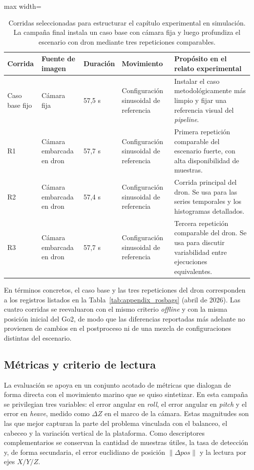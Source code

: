 \documentclass[12pt,a4paper]{report}
\begin{document}
\begin{table}[H]
\centering
\caption{Corridas seleccionadas para estructurar el capítulo experimental en
simulación. La campaña final instala un caso base con cámara fija y luego
profundiza el escenario con dron mediante tres repeticiones comparables.}
\label{tab:sim_selected_runs}
\begin{adjustbox}{max width=\textwidth}
\begin{tabular}{p{}>{\raggedright\arraybackslash}p{}p{}p{}p{}}
\toprule
Corrida & Fuente de imagen & Duración & Movimiento & Propósito en el relato experimental \\
\midrule
Caso base fijo & Cámara fija & 57,5 s & Configuración sinusoidal de referencia & Instalar el caso metodológicamente más limpio y fijar una referencia visual del \textit{pipeline}. \\
R1 & Cámara embarcada en dron & 57,7 s & Configuración sinusoidal de referencia & Primera repetición comparable del escenario fuerte, con alta disponibilidad de muestras. \\
R2 & Cámara embarcada en dron & 57,4 s & Configuración sinusoidal de referencia & Corrida principal del dron. Se usa para las series temporales y los histogramas detallados. \\
R3 & Cámara embarcada en dron & 57,7 s & Configuración sinusoidal de referencia & Tercera repetición comparable del dron. Se usa para discutir variabilidad entre ejecuciones equivalentes. \\
\bottomrule
\end{tabular}
\end{adjustbox}
\end{table}

En términos concretos, el caso base y las tres repeticiones del dron corresponden
a los registros listados en la Tabla~\ref{tab:appendix_rosbags} (abril de
2026). Las cuatro corridas se reevaluaron con el mismo criterio
\textit{offline} y con la misma posición inicial del Go2, de modo que las
diferencias reportadas más adelante no provienen de cambios en el postproceso ni
de una mezcla de configuraciones distintas del escenario.

\subsection{Métricas y criterio de lectura}

La evaluación se apoya en un conjunto acotado de métricas que dialogan de forma
directa con el movimiento marino que se quiso sintetizar. En esta campaña se
privilegian tres variables: el error angular en \emph{roll}, el error angular
en \emph{pitch} y el error en \emph{heave}, medido como \(\Delta Z\) en el
marco de la cámara. Estas magnitudes son las que mejor capturan la parte del
problema vinculada con el balanceo, el cabeceo y la variación vertical de la
plataforma. Como descriptores complementarios se conservan la cantidad de
muestras útiles, la tasa de detección y, de forma secundaria, el error
euclidiano de posición \(\|\Delta pos\|\) y la lectura por ejes \(X/Y/Z\).
\end{document}
